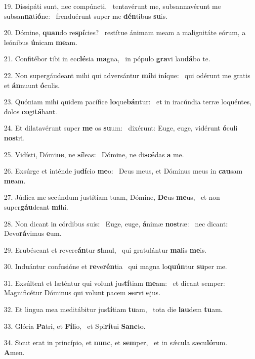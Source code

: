 19. Dissipáti sunt, nec compúncti, \dag\  tentavérunt me, subsannavérunt me subsan\textbf{na}ti\textbf{ó}ne: \ast\  frenduérunt super me \textbf{dén}tibus \textbf{su}is.\

20. Dómine, \textbf{quan}do re\textbf{spí}cies? \ast\  restítue ánimam meam a malignitáte eórum, a leónibus \textbf{ú}nicam \textbf{me}am.\

21. Confitébor tibi in ec\textbf{clé}sia \textbf{ma}gna, \ast\  in pópulo \textbf{gra}vi lau\textbf{dá}bo te.\

22. Non supergáudeant mihi qui adversántur \textbf{mi}hi in\textbf{í}que: \ast\  qui odérunt me gratis et \textbf{án}nuunt \textbf{ó}culis.\

23. Quóniam mihi quidem pacífice \textbf{lo}que\textbf{bán}tur: \ast\  et in iracúndia terræ loquéntes, dolos \textbf{co}gi\textbf{tá}bant.\

24. Et dilatavérunt super \textbf{me} os \textbf{su}um: \ast\  dixérunt: Euge, euge, vidérunt \textbf{ó}culi \textbf{nos}tri.\

25. Vidísti, Dómi\textbf{ne}, ne \textbf{sí}leas: \ast\  Dómine, ne di\textbf{scé}das \textbf{a} me.\

26. Exsúrge et inténde ju\textbf{dí}cio \textbf{me}o: \ast\  Deus meus, et Dóminus meus in \textbf{cau}sam \textbf{me}am.\

27. Júdica me secúndum justítiam tuam, Dómine, \textbf{De}us \textbf{me}us, \ast\  et non super\textbf{gáu}deant \textbf{mi}hi.\

28. Non dicant in córdibus suis: \dag\  Euge, euge, \textbf{á}nimæ \textbf{nos}træ: \ast\  nec dicant: Devo\textbf{rá}vimus \textbf{e}um.\

29. Erubéscant et revere\textbf{án}tur \textbf{si}mul, \ast\  qui gratulántur \textbf{ma}lis \textbf{me}is.\

30. Induántur confusióne et \textbf{re}ve\textbf{rén}tia \ast\  qui magna lo\textbf{quún}tur \textbf{su}per me.\

31. Exsúltent et læténtur qui volunt jus\textbf{tí}tiam \textbf{me}am: \ast\  et dicant semper: Magnificétur Dóminus qui volunt pacem \textbf{ser}vi \textbf{e}jus.\

32. Et lingua mea meditábitur jus\textbf{tí}tiam \textbf{tu}am, \ast\  tota die \textbf{lau}dem \textbf{tu}am.\

33. Glória \textbf{Pa}tri, et \textbf{Fí}lio, \ast\  et Spi\textbf{rí}tui \textbf{Sanc}to.\

34. Sicut erat in princípio, et \textbf{nunc}, et \textbf{sem}per, \ast\  et in sǽcula sæcu\textbf{ló}rum. \textbf{A}men.\

